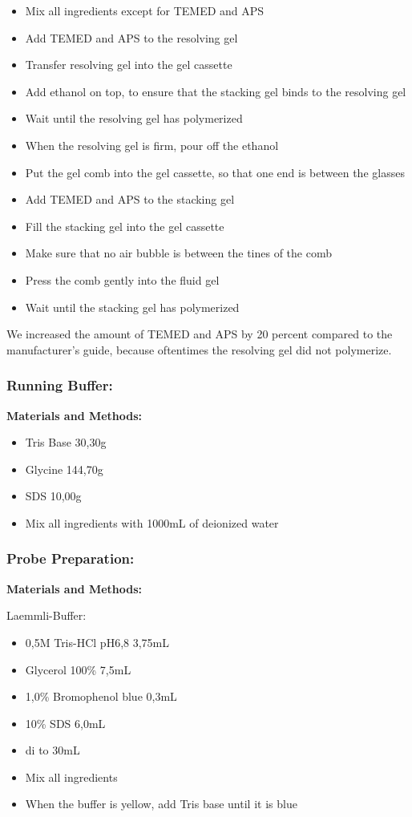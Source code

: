 \begin{itemize}
    \item Mix all ingredients except for TEMED and APS
    \item Add TEMED and APS to the resolving gel
    \item Transfer resolving gel into the gel cassette
    \item Add ethanol on top, to ensure that the stacking gel binds to the resolving gel
    \item Wait until the resolving gel has polymerized
    \item When the resolving gel is firm, pour off the ethanol
    \item Put the gel comb into the gel cassette, so that one end is between the glasses
    \item Add TEMED and APS to the stacking gel
    \item Fill the stacking gel into the gel cassette
    \item Make sure that no air bubble is between the tines of the comb
    \item Press the comb gently into the fluid gel
    \item Wait until the stacking gel has polymerized
\end{itemize}

We increased the amount of TEMED and APS by 20 percent compared to the manufacturer's guide, because oftentimes the resolving gel did not polymerize.

\subsubsection{Running Buffer:}
\textbf{Materials and Methods:}
\begin{itemize}
    \item Tris Base 30,30g
    \item Glycine 144,70g
    \item SDS 10,00g
    \item Mix all ingredients with 1000mL of deionized water
\end{itemize}

\subsubsection{Probe Preparation:}
\textbf{Materials and Methods:}

Laemmli-Buffer:
\begin{itemize}
    \item 0,5M Tris-HCl pH6,8 3,75mL
    \item Glycerol 100\% 7,5mL
    \item 1,0\% Bromophenol blue 0,3mL
    \item 10\% SDS 6,0mL
    \item di to 30mL
    \item Mix all ingredients
    \item When the buffer is yellow, add Tris base until it is blue
\end{itemize}

